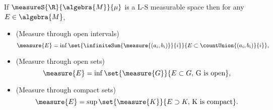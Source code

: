 \begin{Theorem}[name=Equivalent characterizations of L-S measures]\label{thm:equiv_lebesgue_meas}
    If $\measureS{\R}{\algebra{M}}{\mu}$ is a L-S measurable space then for any $E \in \algebra{M}$,
    \begin{itemize}
	\item (Measure through open intervals)
	    \begin{equation}\label{eq:ls_measure_open_interval}
		\measure{E} =
		\inf\set{\infiniteSum{\measure{(a_i,b_i)}}{i}}{E\subset\countUnion{(a_i,b_i)}{i}},
	    \end{equation}
	\item (Measure through open sets)
	    \begin{equation}\label{eq:ls_measure_open_set}
		\measure{E} =
		\inf\set{\measure{G}}{E\subset G,\,\text{G is open}},
	    \end{equation}
	\item (Measure through compact sets)
	    \begin{equation}\label{eq:ls_measure_compact_set}
		\measure{E} =
		\sup\set{\measure{K}}{E\supset K,\,\text{K is compact}}.
	    \end{equation}
    \end{itemize}
\end{Theorem}
